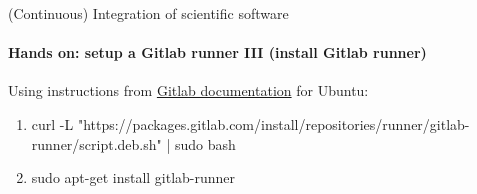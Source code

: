 \begin{frame}{(Continuous) Integration of scientific software}
    \framesubtitle{Hands on: setup a Gitlab runner III (install Gitlab runner)}
    Using instructions from \href{https://docs.gitlab.com/runner/install/linux-repository.html}{Gitlab documentation} for Ubuntu:
    \begin{enumerate}
        \item curl -L "https://packages.gitlab.com/install/repositories/runner/gitlab-runner/script.deb.sh" | sudo bash
        \item sudo apt-get install gitlab-runner
    \end{enumerate}
\end{frame}
